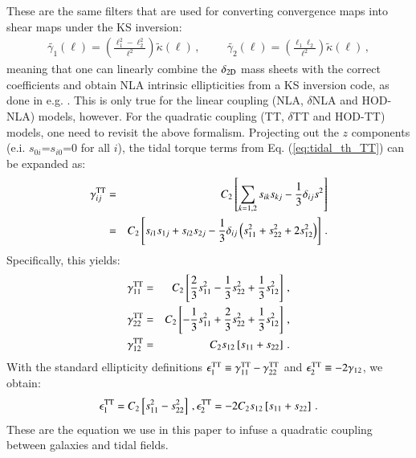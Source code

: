 These are the same filters that are used for converting convergence maps into shear maps under the KS inversion:
 \begin{eqnarray}
 \widetilde{\gamma_1} (\boldsymbol \ell)  = \left(\frac{\ell_1^2 - \ell_2^2}{\ell^2} \right) \widetilde {\kappa}(\boldsymbol \ell) \, , \hspace{1cm} \widetilde{\gamma_2} (\boldsymbol \ell)  = \left(\frac{\ell_1 \ell_2}{\ell^2} \right) \widetilde {\kappa}(\boldsymbol \ell) \, ,
\end{eqnarray}
meaning that one can linearly combine the ${\delta}_{\rm 2D}$ mass sheets with the correct coefficients and obtain NLA intrinsic ellipticities from a KS inversion code, as done in e.g. \citet{Zuercher2020a}. 
This is only true for the linear coupling (NLA,  $\delta$NLA and HOD-NLA) models, however. For the quadratic coupling (TT, $\delta$TT and HOD-TT) models, one need to revisit the above formalism.
Projecting out the $z$ components (e.i. $s_{0i}$=$s_{i0}$=0 for all $i$),  the tidal torque terms from Eq. (\ref{eq:tidal_th_TT}) can be expanded as:
 \begin{eqnarray}
\gamma^{\rm TT}_{ij}&=& C_2 \left[\sum_{k=1,2} s_{ik} s_{kj} -\frac{1}{3} \delta_{ij} s^2\right] \\
                                  &=&C_2 \left[ s_{i1}s_{1j}  + s_{i2}s_{2j}  -  \frac{1}{3} \delta_{ij} \left( s_{11}^2 + s_{22}^2 +2s_{12}^2 \right)  \right] \, .
\end{eqnarray}
Specifically, this yields:
 \begin{eqnarray}
\gamma^{\rm TT}_{11}&=& C_2 \left[\frac{2}{3}s_{11}^2  -  \frac{1}{3}s_{22}^2 + \frac{1}{3}s_{12}^2 \right]\, ,  \nonumber \\
\gamma^{\rm TT}_{22}&=& C_2 \left[-\frac{1}{3}s_{11}^2  +  \frac{2}{3}s_{22}^2 + \frac{1}{3}s_{12}^2  \right]\, , \\
\gamma^{\rm TT}_{12}&=& C_2 s_{12}\left[s_{11}+s_{22}  \right]\, . \nonumber                                  
\end{eqnarray}
With the standard ellipticity definitions $\epsilon_1^{\rm TT}\equiv \gamma_{11}^{\rm TT} - \gamma_{22}^{\rm TT}$ and $\epsilon_2^{\rm TT}\equiv -2 \gamma_{12}$, we obtain:
\begin{eqnarray}
\epsilon_1^{\rm TT} = C_2  \left[ s_{11}^2 - s_{22}^2\right] \, , \epsilon_2^{\rm TT} = -2 C_2 s_{12}\left[s_{11}+s_{22}  \right]\, .
\end{eqnarray}
These are the equation we use in this paper to infuse a quadratic coupling between galaxies and tidal fields.
